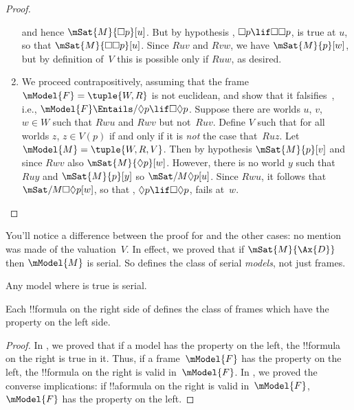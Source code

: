 \documentclass[../../../include/open-logic-section]{subfiles}
\begin{document}
\begin{proof}
\begin{enumerate}
    and hence $\mSat{M}{\Box p}[u]$. But by hypothesis , $\Box p
    \lif \Box \Box p$, is true at $u$, so that $\mSat{M}{\Box \Box
      p}[u]$. Since $Ruv$ and $Rvw$, we have $\mSat{M}{p}[w]$, but by
    definition of~$V$ this is possible only if $Ruw$, as desired.
  \item We proceed contrapositively, assuming that the frame
    $\mModel{F} = \tuple{W, R}$ is not euclidean, and show that it
    falsifies~, i.e., $\mModel{F} \Entails/ \Diamond p \lif
      \Box\Diamond p$. Suppose there are worlds $u$, $v$, $w \in W$
    such that $Rwu$ and $Rwv$ but not~$Ruv$. Define $V$ such that for
    all worlds $z$, $z \in V(p)$ if and only if it is \emph{not} the
    case that~$Ruz$. Let $\mModel{M} =\tuple{W, R, V}$. Then by
    hypothesis $\mSat{M}{p}[v]$ and since $Rwv$ also
    $\mSat{M}{\Diamond p}[w]$. However, there is no world $y$ such
    that $Ruy$ and $\mSat{M}{p}[y]$ so $\mSat/{M}{\Diamond
      p}[u]$. Since $Rwu$, it follows that $\mSat/{M}{\Box\Diamond
      p}[w]$, so that , $\Diamond p \lif \Box\Diamond p$, fails
    at~$w$.
  \end{enumerate}
\end{proof}

You'll notice a difference between the proof for  and the other
cases: no mention was made of the valuation~$V$. In effect, we proved
that if $\mSat{M}{\Ax{D}}$ then $\mModel{M}$ is serial. So 
defines the class of serial \emph{models}, not just frames.

\begin{cor}
  Any model where  is true is serial.
\end{cor}

\begin{cor}
Each !!{formula} on the right side of  defines
the class of frames which have the property on the left side.
\end{cor}

\begin{proof}
  In , we proved that if a model has the
  property on the left, the !!{formula} on the right is true in
  it. Thus, if a frame~$\mModel{F}$ has the property on the left, the
  !!{formula} on the right is valid in~$\mModel{F}$. In
  , we proved the converse implications:
  if !!a{formula} on the right is valid in~$\mModel{F}$, $\mModel{F}$
  has the property on the left.
\end{proof}
\end{document}
